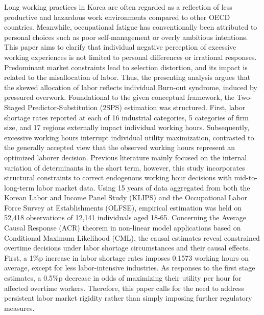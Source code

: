\documentclass[
  12pt,
]{article}
\begin{document}
Long working practices in Korea are often regarded as a reflection of
less productive and hazardous work environments compared to other OECD
countries. Meanwhile, occupational fatigue has conventionally been
attributed to personal choices such as poor self-management or overly
ambitious intentions. This paper aims to clarify that individual
negative perception of excessive working experiences is not limited to
personal differences or irrational responses. Predominant market
constraints lead to selection distortion, and its impact is related to
the misallocation of labor. Thus, the presenting analysis argues that
the skewed allocation of labor reflects individual Burn-out syndrome,
induced by pressured overwork. Foundational to the given conceptual
framework, the Two-Staged Predictor-Substitution (2SPS) estimation was
structured. First, labor shortage rates reported at each of 16
industrial categories, 5 categories of firm size, and 17 regions
externally impact individual working hours. Subsequently, excessive
working hours interrupt individual utility maximization, contrasted to
the generally accepted view that the observed working hours represent an
optimized laborer decision. Previous literature mainly focused on the
internal variation of determinants in the short term, however, this
study incorporates structural constraints to correct endogenous working
hour decisions with mid-to-long-term labor market data. Using 15 years
of data aggregated from both the Korean Labor and Income Panel Study
(KLIPS) and the Occupational Labor Force Survey at Establishments
(OLFSE), empirical estimation was held on 52,418 observations of 12,141
individuals aged 18-65. Concerning the Average Causal Response (ACR)
theorem in non-linear model applications based on Conditional Maximum
Likelihood (CML), the causal estimates reveal constrained overtime
decisions under labor shortage circumstances and their causal effects.
First, a 1\%p increase in labor shortage rates imposes 0.1573 working
hours on average, except for less labor-intensive industries. As
responses to the first stage estimates, a 0.5\%p decrease in odds of
maximizing their utility per hour for affected overtime workers.
Therefore, this paper calls for the need to address persistent labor
market rigidity rather than simply imposing further regulatory measures.

\setlength{\parindent}{2em}

\thispagestyle{empty}

\newpage

\thispagestyle{empty}
\end{document}
